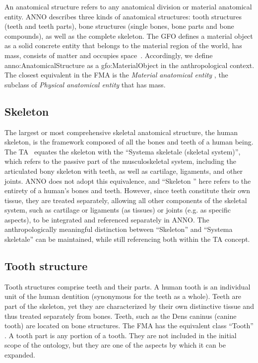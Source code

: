 \documentclass[sw]{iosart2x}
\begin{document}
An anatomical structure refers to any anatomical division or material anatomical entity.
ANNO describes three kinds of anatomical structures: tooth structures (teeth and teeth parts), bone structures (single bones, bone parts and bone compounds), as well as the complete skeleton.
The GFO defines a material object  as a solid concrete entity that belongs to the material region of the world, has mass, consists of matter and occupies space~\citep{gfospace}.
Accordingly, we define anno:AnatomicalStructure as a gfo:MaterialObject in the anthropological context.
The closest equivalent in the FMA is the \emph{Material anatomical entity} , the subclass of \emph{Physical anatomical entity}  that has mass.

\subsection{Skeleton}
The largest or most comprehensive skeletal anatomical structure, the human skeleton, is the framework composed of all the bones and teeth of a human being.
The TA~\citep{ta2} equates the skeleton with the \enquote{Systema skeletale (skeletal system)}, which refers to the passive part of the musculoskeletal system, including the articulated bony skeleton with teeth, as well as cartilage, ligaments, and other joints.
ANNO does not adopt this equivalence, and \enquote{Skeleton } here refers to the entirety of a human's bones and teeth.
However, since teeth constitute their own tissue, they are treated separately, allowing all other components of the skeletal system, such as cartilage or ligaments (as tissues) or joints (e.g. as specific aspects), to be integrated and referenced separately in ANNO.
The anthropologically meaningful distinction between \enquote{Skeleton} and \enquote{Systema skeletale} can be maintained, while still referencing both within the TA concept.

\subsection{Tooth structure}
Tooth structures comprise teeth and their parts.
A human tooth is an individual unit of the human dentition (synonymous for the teeth as a whole).
Teeth are part of the skeleton, yet they are characterized by their own distinctive tissue and thus treated separately from bones.
Teeth, such as the Dens caninus (canine tooth) are located on bone structures.
The FMA has the equivalent class \enquote{Tooth} .
A tooth part is any portion of a tooth.
They are not included in the initial scope of the ontology, but they are one of the aspects by which it can be expanded.
\end{document}

